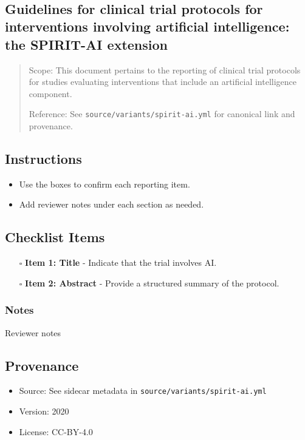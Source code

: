 \documentclass[11pt]{article}
\def\tightlist{}
\begin{document}
\begin{center}
{\LARGE }\\[4pt]
\normalsize 
\end{center}
\vspace{1em}

\begin{Form}

\section{Guidelines for clinical trial protocols for interventions
involving artificial intelligence: the SPIRIT-AI
extension}\label{guidelines-for-clinical-trial-protocols-for-interventions-involving-artificial-intelligence-the-spirit-ai-extension}

\begin{quote}
Scope: This document pertains to the reporting of clinical trial
protocols for studies evaluating interventions that include an
artificial intelligence component.

Reference: See \texttt{source/variants/spirit-ai.yml} for canonical link
and provenance.
\end{quote}

\subsection{Instructions}\label{instructions}

\begin{itemize}
\tightlist
\item
  Use the boxes to confirm each reporting item.
\item
  Add reviewer notes under each section as needed.
\end{itemize}

\subsection{Checklist Items}\label{checklist-items}

\begin{itemize}
\tightlist
\item[$\square$]
  \textbf{Item 1: Title} - Indicate that the trial involves AI.
\item[$\square$]
  \textbf{Item 2: Abstract} - Provide a structured summary of the
  protocol.
\end{itemize}

\subsubsection{Notes}\label{notes}

{Reviewer notes}

\subsection{Provenance}\label{provenance}

\begin{itemize}
\tightlist
\item
  Source: See sidecar metadata in \texttt{source/variants/spirit-ai.yml}
\item
  Version: 2020
\item
  License: CC-BY-4.0
\end{itemize}

\end{Form}
\end{document}
